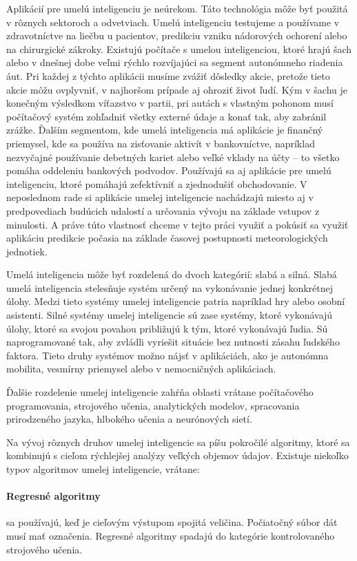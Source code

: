 Aplikácií pre umelú inteligenciu je neúrekom. Táto technológia môže byť použitá v rôznych sektoroch a odvetviach. Umelú inteligenciu testujeme a používame v zdravotníctve na liečbu u pacientov, predikciu vzniku nádorových ochorení alebo na chirurgické zákroky. Existujú počítače s umelou inteligenciou, ktoré hrajú šach alebo v dnešnej dobe veľmi rýchlo rozvíjajúci sa segment autonómneho riadenia áut. Pri každej z týchto aplikácii musíme zvážiť dôsledky akcie, pretože tieto akcie môžu ovplyvniť, v najhoršom prípade aj ohroziť život ľudí. Kým v šachu je konečným výsledkom víťazstvo v partii, pri autách s vlastným pohonom musí počítačový systém zohľadniť všetky externé údaje a konať tak, aby zabránil zrážke. Ďalším segmentom, kde umelá inteligencia má aplikácie je finančný priemysel, kde sa používa na zisťovanie aktivít v bankovníctve, napríklad nezvyčajné používanie debetných kariet alebo veľké vklady na účty – to všetko pomáha oddeleniu bankových podvodov. Používajú sa aj aplikácie pre umelú inteligenciu, ktoré pomáhajú zefektívniť a zjednodušiť obchodovanie. V neposlednom rade si aplikácie umelej inteligencie nachádzajú miesto aj v predpovediach budúcich udalostí a určovania vývoju na základe vstupov z minulosti. A práve túto vlastnosť chceme v tejto práci využiť a pokúsiť sa využiť aplikáciu predikcie počasia na základe časovej postupnosti meteorologických jednotiek.

Umelá inteligencia môže byť rozdelená do dvoch kategórií: slabá a silná. Slabá umelá inteligencia stelesňuje systém určený na vykonávanie jednej konkrétnej úlohy. Medzi tieto systémy umelej inteligencie patria napríklad hry alebo osobní asistenti. Silné systémy umelej inteligencie sú zase systémy, ktoré vykonávajú úlohy, ktoré sa svojou povahou približujú k tým, ktoré vykonávajú ľudia. Sú naprogramované tak, aby zvládli vyriešit situácie bez nutnosti zásahu ľudského faktora. Tieto druhy systémov možno nájsť v aplikáciách, ako je autonómna mobilita, vesmírny priemysel alebo v nemocničných aplikáciach.

Ďalšie rozdelenie umelej inteligencie zahŕňa oblasti vrátane počítačového programovania, strojového učenia, analytických modelov, spracovania prirodzeného jazyka, hlbokého učenia a neurónových sietí.

Na vývoj rôznych druhov umelej inteligencie sa píšu pokročilé algoritmy, ktoré sa kombinujú s cieľom rýchlejšej analýzy veľkých objemov údajov. Existuje niekoľko typov algoritmov umelej inteligencie, vrátane:
\paragraph{Regresné algoritmy} sa používajú, keď je cieľovým výstupom spojitá veličina. Počiatočný súbor dát musí mať označenia. Regresné algoritmy spadajú do kategórie kontrolovaného strojového učenia.

